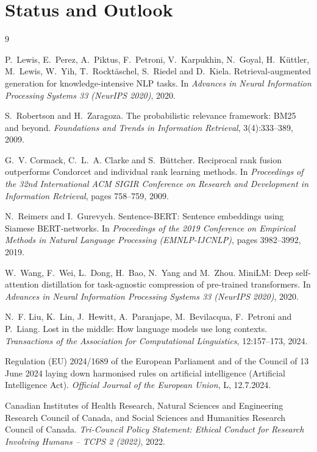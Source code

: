 \documentclass[a4paper,11pt]{article}
\begin{document}
\part*{Status and Outlook}
\suppressfloats[t]


\clearpage
{}
\begin{thebibliography}{9}

P.~Lewis, E.~Perez, A.~Piktus, F.~Petroni, V.~Karpukhin, N.~Goyal,
H.~K\"uttler, M.~Lewis, W.~Yih, T.~Rockt\"aschel, S.~Riedel and D.~Kiela.
Retrieval-augmented generation for knowledge-intensive NLP tasks.
In \emph{Advances in Neural Information Processing Systems 33 (NeurIPS 2020)}, 2020.

S.~Robertson and H.~Zaragoza.
The probabilistic relevance framework: BM25 and beyond.
\emph{Foundations and Trends in Information Retrieval}, 3(4):333--389, 2009.

G.~V. Cormack, C.~L.~A. Clarke and S.~B\"uttcher.
Reciprocal rank fusion outperforms Condorcet and individual rank learning methods.
In \emph{Proceedings of the 32nd International ACM SIGIR Conference on Research
and Development in Information Retrieval}, pages 758--759, 2009.

N.~Reimers and I.~Gurevych.
Sentence-BERT: Sentence embeddings using Siamese BERT-networks.
In \emph{Proceedings of the 2019 Conference on Empirical Methods in Natural
Language Processing (EMNLP-IJCNLP)}, pages 3982--3992, 2019.

W.~Wang, F.~Wei, L.~Dong, H.~Bao, N.~Yang and M.~Zhou.
MiniLM: Deep self-attention distillation for task-agnostic compression of
pre-trained transformers.
In \emph{Advances in Neural Information Processing Systems 33 (NeurIPS 2020)}, 2020.

N.~F. Liu, K.~Lin, J.~Hewitt, A.~Paranjape, M.~Bevilacqua, F.~Petroni and P.~Liang.
Lost in the middle: How language models use long contexts.
\emph{Transactions of the Association for Computational Linguistics}, 12:157--173, 2024.

Regulation (EU) 2024/1689 of the European Parliament and of the Council of
13 June 2024 laying down harmonised rules on artificial intelligence
(Artificial Intelligence Act).
\emph{Official Journal of the European Union}, L, 12.7.2024.

Canadian Institutes of Health Research, Natural Sciences and Engineering
Research Council of Canada, and Social Sciences and Humanities Research
Council of Canada.
\emph{Tri-Council Policy Statement: Ethical Conduct for Research Involving
Humans -- TCPS 2 (2022)}, 2022.

\end{thebibliography}
\end{document}
